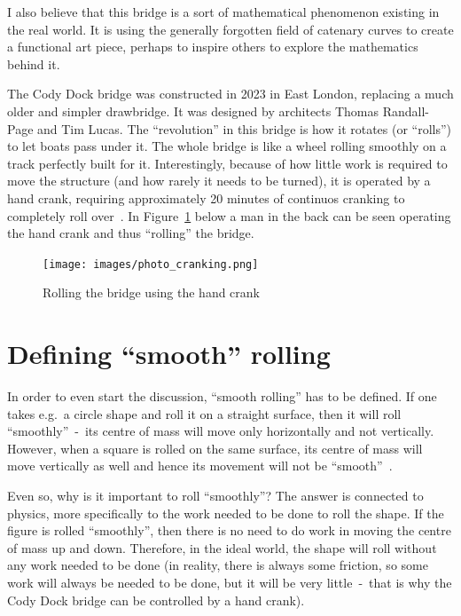 \documentclass[12pt]{article}
\begin{document}
        I also believe that this bridge is a sort of mathematical phenomenon existing in the real world. It is using the generally forgotten field of catenary curves to create a functional art piece, perhaps to inspire others to explore the mathematics behind it.

        The Cody Dock bridge was constructed in 2023 in East London, replacing a much older and simpler drawbridge. It was designed by architects Thomas Randall-Page and Tim Lucas. The ``revolution'' in this bridge is how it rotates (or ``rolls'') to let boats pass under it. The whole bridge is like a wheel rolling smoothly on a track perfectly built for it. Interestingly, because of how little work is required to move the structure (and how rarely it needs to be turned), it is operated by a hand crank, requiring approximately 20 minutes of continuos cranking to completely roll over~\cite{bridge_newatlas,parker.2023}. In Figure~\ref{fig:photo_cranking} below a man in the back can be seen operating the hand crank and thus ``rolling'' the bridge.

        \begin{figure}[H]
            \centering
            \texttt{[image: images/photo\_cranking.png]}
            \caption[Rolling the bridge using the hand crank]{Rolling the bridge using the hand crank~\cite{bridge_photos}}\label{fig:photo_cranking}
        \end{figure}

    \section{Defining ``smooth'' rolling}

        In order to even start the discussion, ``smooth rolling'' has to be defined. If one takes e.g.\ a circle shape and roll it on a straight surface, then it will roll ``smoothly''~-~its centre of mass will move only horizontally and not vertically. However, when a square is rolled on the same surface, its centre of mass will move vertically as well and hence its movement will not be ``smooth''~\cite{morphocular.2022,Hall_Wagon_1992}.

        Even so, why is it important to roll ``smoothly''? The answer is connected to physics, more specifically to the work needed to be done to roll the shape. If the figure is rolled ``smoothly'', then there is no need to do work in moving the centre of mass up and down. Therefore, in the ideal world, the shape will roll without any work needed to be done (in reality, there is always some friction, so some work will always be needed to be done, but it will be very little~-~that is why the Cody Dock bridge can be controlled by a hand crank).
\end{document}
